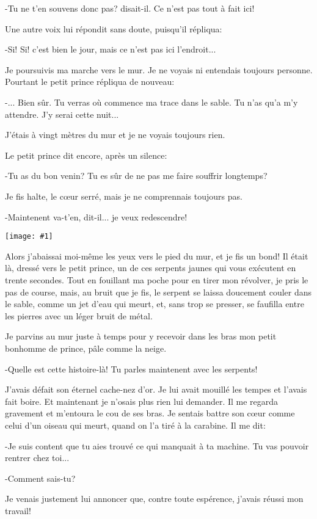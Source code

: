 \documentclass{report}
\newcommand{\incpic}[1]{%
\end{paracol}
\begin{center}
    \texttt{[image: \#1]}
\end{center}
\begin{paracol}{2}}
\begin{document}
\begin{paracol}{2}
-Tu ne t'en souvens donc pas? disait-il. Ce n'est pas tout à fait ici!

Une autre voix lui répondit sans doute, puisqu'il répliqua:

-Si! Si! c'est bien le jour, mais ce n'est pas ici l'endroit...

Je poursuivis ma marche vers le mur. Je ne voyais ni entendais toujours personne. Pourtant le petit prince répliqua de nouveau:

-... Bien sûr. Tu verras où commence ma trace dans le sable. Tu n'as qu'a m'y attendre. J'y serai cette nuit...

J'étais à vingt mètres du mur et je ne voyais toujours rien.

Le petit prince dit encore, après un silence:

-Tu as du bon venin? Tu es sûr de ne pas me faire souffrir longtemps?

Je fis halte, le cœur serré, mais je ne comprennais toujours pas.

-Maintenent va-t'en, dit-il... je veux redescendre! 

\incpic{pic/image42.jpeg}

Alors j'abaissai moi-même les yeux vers le pied du mur, et je fis un bond! Il était là, dressé vers le petit prince, un de ces serpents jaunes qui vous exécutent en trente secondes. Tout en fouillant ma poche pour en tirer mon révolver, je pris le pas de course, mais, au bruit que je fis, le serpent se laissa doucement couler dans le sable, comme un jet d'eau qui meurt, et, sans trop se presser, se faufilla entre les pierres avec un léger bruit de métal.

Je parvins au mur juste à temps pour y recevoir dans les bras mon petit bonhomme de prince, pâle comme la neige.

-Quelle est cette histoire-là! Tu parles maintenent avec les serpents!

J'avais défait son éternel cache-nez d'or. Je lui avait mouillé les tempes et l'avais fait boire. Et maintenant je n'osais plus rien lui demander. Il me regarda gravement et m'entoura le cou de ses bras. Je sentais battre son cœur comme celui d'un oiseau qui meurt, quand on l'a tiré à la carabine. Il me dit:

-Je suis content que tu aies trouvé ce qui manquait à ta machine. Tu vas pouvoir rentrer chez toi...

-Comment sais-tu?

Je venais justement lui annoncer que, contre toute espérence, j'avais réussi mon travail!


\end{paracol}
\end{document}

